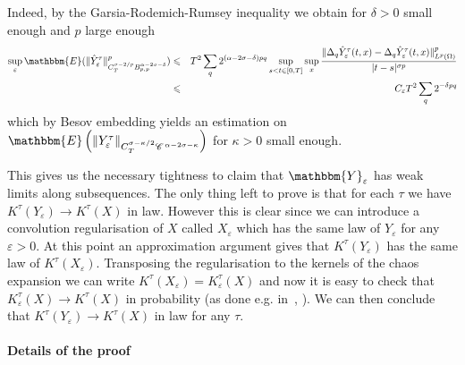 \documentclass[a4paper,11pt]{article}
\newcommand{\CC}{\mathscr{C} \hspace{.1em}}
\begin{document}
Indeed, by the Garsia-Rodemich-Rumsey inequality we obtain for $\delta > 0$
small enough and $p$ large enough
\begin{eqnarray*}
  \sup_{\varepsilon} \mathbbm{E} (\| \hat{Y}_{\varepsilon}^{\tau}
  \|^p_{C_T^{\sigma - 2 / p} B^{\alpha - 2 \sigma - \delta}_{p, p}}) &
  \leqslant & T^2 \sum_q 2^{(\alpha - 2 \sigma - \delta) pq} \sup_{s < t \in
  [0, T]} \sup_x \frac{\| \Delta_q \hat{Y}_{\varepsilon}^{\tau} (t, x) -
  \Delta_q \hat{Y}_{\varepsilon}^{\tau} (t, x) \|_{L^p (\Omega)}^p}{| t - s
  |^{\sigma p}}\\
  & \leqslant & C_{\varepsilon} T^2 \sum_q 2^{- \delta pq}
\end{eqnarray*}
which by Besov embedding yields an estimation on $\mathbbm{E} \left( \|
Y_{\varepsilon}^{\tau} \|_{C_T^{\sigma - \kappa / 2} \CC^{\alpha - 2 \sigma -
\kappa}} \right)$ for $\kappa > 0$ small enough.

This gives us the necessary tightness to claim that
$\mathbbm{Y}_{\varepsilon}$ has weak limits along subsequences. The only thing
left to prove is that for each $\tau$ we have $K^{\tau} (Y_{\varepsilon})
\rightarrow K^{\tau} (X)$ in law. However this is clear since we can introduce
a convolution regularisation of $X$ called $X_{\varepsilon}$ which has the
same law of $Y_{\varepsilon}$ for any $\varepsilon > 0$. At this point an
approximation argument gives that $K^{\tau} (Y_{\varepsilon})$ has the same
law of $K^{\tau} (X_{\varepsilon})$. Transposing the regularisation to the
kernels of the chaos expansion we can write $K^{\tau} (X_{\varepsilon}) =
K_{\varepsilon}^{\tau} (X)$ and now it is easy to check that \
$K_{\varepsilon}^{\tau} (X) \rightarrow K^{\tau} (X)$ in probability (as done
e.g. in~{\cite{catellier_paracontrolled_2013}}, {\cite{hairer_theory_2014}}).
We can then conclude that $K^{\tau} (Y_{\varepsilon}) \rightarrow K^{\tau}
(X)$ in law for any $\tau$.

\paragraph{Details of the proof}
\end{document}

